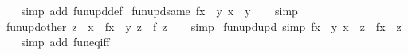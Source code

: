 \begin{isabellebody}
%
\isadelimproof
\ \ %
\endisadelimproof
%
\isatagproof
{}\isamarkupfalse%
\ {\isacharparenleft}{\kern0pt}simp\ add{\isacharcolon}{\kern0pt}\ fun{\isacharunderscore}{\kern0pt}upd{\isacharunderscore}{\kern0pt}def{\isacharparenright}{\kern0pt}%
\endisatagproof
{\isafoldproof}%
%
\isadelimproof
\isanewline
%
\endisadelimproof
\isanewline
\isanewline
{}\isamarkupfalse%
\ fun{\isacharunderscore}{\kern0pt}upd{\isacharunderscore}{\kern0pt}same{\isacharcolon}{\kern0pt}\ {\isachardoublequoteopen}{\isacharparenleft}{\kern0pt}f{\isacharparenleft}{\kern0pt}x\ {\isacharcolon}{\kern0pt}{\isacharequal}{\kern0pt}\ y{\isacharparenright}{\kern0pt}{\isacharparenright}{\kern0pt}\ x\ {\isacharequal}{\kern0pt}\ y{\isachardoublequoteclose}\isanewline
%
\isadelimproof
\ \ %
\endisadelimproof
%
\isatagproof
{}\isamarkupfalse%
\ simp%
\endisatagproof
{\isafoldproof}%
%
\isadelimproof
\isanewline
%
\endisadelimproof
\isanewline
{}\isamarkupfalse%
\ fun{\isacharunderscore}{\kern0pt}upd{\isacharunderscore}{\kern0pt}other{\isacharcolon}{\kern0pt}\ {\isachardoublequoteopen}z\ {\isasymnoteq}\ x\ {\isasymLongrightarrow}\ {\isacharparenleft}{\kern0pt}f{\isacharparenleft}{\kern0pt}x\ {\isacharcolon}{\kern0pt}{\isacharequal}{\kern0pt}\ y{\isacharparenright}{\kern0pt}{\isacharparenright}{\kern0pt}\ z\ {\isacharequal}{\kern0pt}\ f\ z{\isachardoublequoteclose}\isanewline
%
\isadelimproof
\ \ %
\endisadelimproof
%
\isatagproof
{}\isamarkupfalse%
\ simp%
\endisatagproof
{\isafoldproof}%
%
\isadelimproof
\isanewline
%
\endisadelimproof
\isanewline
{}\isamarkupfalse%
\ fun{\isacharunderscore}{\kern0pt}upd{\isacharunderscore}{\kern0pt}upd\ {\isacharbrackleft}{\kern0pt}simp{\isacharbrackright}{\kern0pt}{\isacharcolon}{\kern0pt}\ {\isachardoublequoteopen}f{\isacharparenleft}{\kern0pt}x\ {\isacharcolon}{\kern0pt}{\isacharequal}{\kern0pt}\ y{\isacharcomma}{\kern0pt}\ x\ {\isacharcolon}{\kern0pt}{\isacharequal}{\kern0pt}\ z{\isacharparenright}{\kern0pt}\ {\isacharequal}{\kern0pt}\ f{\isacharparenleft}{\kern0pt}x\ {\isacharcolon}{\kern0pt}{\isacharequal}{\kern0pt}\ z{\isacharparenright}{\kern0pt}{\isachardoublequoteclose}\isanewline
%
\isadelimproof
\ \ %
\endisadelimproof
%
\isatagproof
{}\isamarkupfalse%
\ {\isacharparenleft}{\kern0pt}simp\ add{\isacharcolon}{\kern0pt}\ fun{\isacharunderscore}{\kern0pt}eq{\isacharunderscore}{\kern0pt}iff{\isacharparenright}{\kern0pt}%
\endisatagproof
{\isafoldproof}%
%
\isadelimproof
\isanewline
%
\endisadelimproof
\isanewline
{}\isamarkupfalse%

\end{isabellebody}
